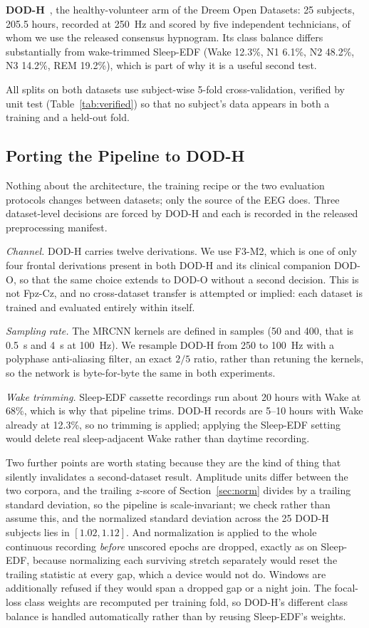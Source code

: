 \documentclass[conference]{IEEEtran}
\begin{document}
\textbf{DOD-H}~\cite{dod}, the healthy-volunteer arm of the Dreem Open Datasets: 25 subjects,
205.5 hours, recorded at 250~Hz and scored by five independent technicians, of whom we use the
released consensus hypnogram. Its class balance differs substantially from wake-trimmed Sleep-EDF
(Wake 12.3\%, N1 6.1\%, N2 48.2\%, N3 14.2\%, REM 19.2\%), which is part of why it is a useful
second test.

All splits on both datasets use subject-wise 5-fold cross-validation, verified by unit test
(Table~\ref{tab:verified}) so that no subject's data appears in both a training and a held-out
fold.

\subsection{Porting the Pipeline to DOD-H}
\label{sec:dodh-prep}

Nothing about the architecture, the training recipe or the two evaluation protocols changes
between datasets; only the source of the EEG does. Three dataset-level decisions are forced by
DOD-H and each is recorded in the released preprocessing manifest.

\emph{Channel.} DOD-H carries twelve derivations. We use F3-M2, which is one of only four frontal
derivations present in both DOD-H and its clinical companion DOD-O, so that the same choice
extends to DOD-O without a second decision. This is not Fpz-Cz, and no cross-dataset transfer is
attempted or implied: each dataset is trained and evaluated entirely within itself.

\emph{Sampling rate.} The MRCNN kernels are defined in samples (50 and 400, that is 0.5~s and 4~s
at 100~Hz). We resample DOD-H from 250 to 100~Hz with a polyphase anti-aliasing filter, an exact
$2/5$ ratio, rather than retuning the kernels, so the network is byte-for-byte the same in both
experiments.

\emph{Wake trimming.} Sleep-EDF cassette recordings run about 20 hours with Wake at 68\%, which is
why that pipeline trims. DOD-H records are 5--10 hours with Wake already at 12.3\%, so no trimming
is applied; applying the Sleep-EDF setting would delete real sleep-adjacent Wake rather than
daytime recording.

Two further points are worth stating because they are the kind of thing that silently invalidates
a second-dataset result. Amplitude units differ between the two corpora, and the trailing $z$-score
of Section~\ref{sec:norm} divides by a trailing standard deviation, so the pipeline is
scale-invariant; we check rather than assume this, and the normalized standard deviation across the
25 DOD-H subjects lies in $[1.02, 1.12]$. And normalization is applied to the whole continuous
recording \emph{before} unscored epochs are dropped, exactly as on Sleep-EDF, because normalizing
each surviving stretch separately would reset the trailing statistic at every gap, which a device
would not do. Windows are additionally refused if they would span a dropped gap or a night join.
The focal-loss class weights are recomputed per training fold, so DOD-H's different class balance
is handled automatically rather than by reusing Sleep-EDF's weights.
\end{document}
